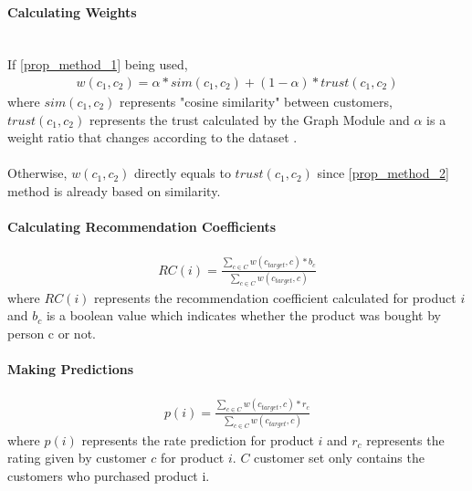 	\paragraph{Calculating Weights} \mbox{}\\
	If \ref{prop_method_1} being used,
	\begin{equation*} 
	\begin{split}
		w(c_{1}, c_{2}) = \alpha*sim(c_{1},c_{2})+(1-\alpha)*trust(c_{1},c_{2})
	\end{split}
	\end{equation*}
	where $sim(c_{1},c_{2})$ represents "cosine similarity" between customers, $trust(c_{1},c_{2})$ represents the trust calculated by the Graph Module and $\alpha$ is a weight ratio that changes according to the dataset .\\ \\
	Otherwise, $w(c_{1}, c_{2})$ directly equals to $trust(c_{1},c_{2})$ since \ref{prop_method_2} method is already based on similarity.

	\paragraph{Calculating Recommendation Coefficients}

	\begin{equation*} 
	\begin{split}
		RC(i) = \frac{\sum_{c \in C}^{} w(c_{target}, c)*b_{c}}{\sum_{c \in C}^{} w(c_{target}, c)}
	\end{split}
	\end{equation*}
	where $RC(i)$ represents the recommendation coefficient calculated for product $i$ and $b_{c}$ is a boolean value which indicates whether the product was bought by person c or not.

	
	\paragraph{Making Predictions}
	\begin{equation*} 
	\begin{split}
		p(i) = \frac{\sum_{c \in C}^{} w(c_{target}, c)*r_{c}}{\sum_{c \in C}^{} w(c_{target}, c)}
	\end{split}
	\end{equation*}
	where $p(i)$ represents the rate prediction for product $i$ and $r_{c}$ represents the rating given by customer $c$ for product $i$. $C$ customer set only contains the customers who purchased product i.
	

